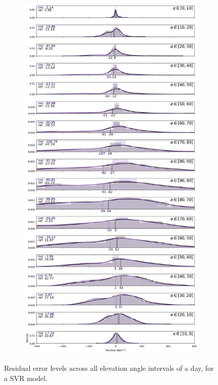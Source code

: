 \begin{figure}\ContinuedFloat
    \begin{subfigure}{\columnwidth}
        \centering
        \includegraphics[width=0.49\columnwidth]{figures/first_study/residual_errors_svr_site4_mae.png}
    \end{subfigure}
    \caption[]{Residual error levels across all elevation angle intervals of a day, for a SVR model.}
\end{figure}


